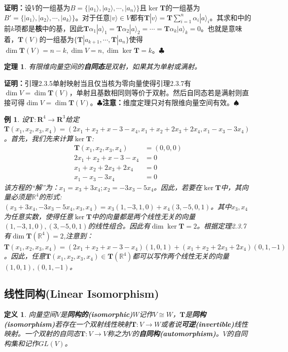 \documentclass[mathserif,hyperref,UTF8,openany,b5paper]{ctexbook}
\newtheorem{exmp}{例}[section]
\newtheorem{defn}{定义}[section]
\newtheorem{thm}{定理}[section]
\begin{document}
\textbf{证明：}设$V$的一组基为$B=\{|a_1\rangle,|a_2\rangle,\cdots,|a_n\rangle\}$且$\ker\mathbf{T}$的一组基为$B'=\{|a_1\rangle,|a_2\rangle,\cdots,|a_k\rangle\}$。对于任意$|v\rangle\in V$都有$\mathbf{T}|v\rangle=\mathbf{T}\sum^n_{i=1}\alpha_i|a\rangle_i$。其求和中的前$k$项都是\textbf{核}中的基，因此$\mathbf{T}\alpha_1|a\rangle_1=\mathbf{T}\alpha_2|a\rangle_2=\cdots=\mathbf{T}\alpha_k|a\rangle_k=0$。也就是意味着，$\mathbf{T}(V)$的一组基为$\{\mathbf{T}|a_{k+1},\cdots,\mathbf{T}|a_{n}\}$使得$\dim\mathbf{T}(V)=n-k,\dim V=n,\dim\ker\mathbf{T}=k$。$\clubsuit$
\begin{thm}
有限维向量空间的\textbf{自同态}是双射，如果其为单射或满射。
\end{thm}
\textbf{证明：}引理2.3.5单射映射当且仅当核为零向量使得引理2.3.7有$\dim V=\dim\mathbf{T}(V)$，单射且基数相同则等价于双射。然后自同态若是满射则直接可得$\dim V=\dim\mathbf{T}(V)$。$\clubsuit$\textbf{注意：}维度定理只对有限维向量空间有效。$\spadesuit$
\begin{exmp}
设$\mathbf{T}:\mathbf{R}^4\xrightarrow{}\mathbf{R}^3$给定$\mathbf{T}(x_1,x_2,x_3,x_4)=(2x_1 + x_2 + x-3−x_4,x_1 + x_2 + 2x_3 + 2x_4,x_1−x_3−3x_4)$。首先，我们先来计算$\ker\mathbf{T}$:
\begin{align}
    \mathbf{T}(x_1,x_2,x_3,x_4)&=(0,0,0)\\
    2x_1 + x_2 + x-3−x_4&=0\\
    x_1 + x_2 + 2x_3 + 2x_4&=0\\
    x_1−x_3−3x_4&=0
\end{align}
该方程的“解”为：$x_1=x_3 + 3x_4;x_2 = − 3x_3 − 5x_4$。因此，若要在$\ker\mathbf{T}$中，其向量必须是$\mathbb{R}^4$的形式:$(x_3 + 3x_4,−3x_3 − 5x_4,x_3,x_4) = x_3(1,−3,1,0)+ x_4(3,−5,0,1)$。其中$x_3,x_4$为任意实数，使得任意$\ker\mathbf{T}$中的向量都是两个线性无关的向量$(1,−3,1,0),(3,−5,0,1)$的线性组合。因此有$\dim\ker\mathbf{T}=2$。根据定理2.3.7有$\dim\mathbf{T}(\mathbb{R}^4)=2$,注意到：$\mathbf{T}(x_1,x_2,x_3,x_4)=(2x_1 + x_2 + x-3−x_4)(1,0,1)+(x_1 + x_2 + 2x_3 + 2x_4)(0,1,-1)$。因此，任意$\mathbf{T}(x_1,x_2,x_3,x_4)\in\mathbf{T}(\mathbb{R}^4)$都可以写作两个线性无关的向量$(1,0,1),(0,1,-1)$。
\end{exmp}
\subsection{线性同构(Linear Isomorphism)}
\begin{defn}
向量空间$V$是\textbf{同构的(isomorphic)}$W$记作$V\cong W$，$\mathbf{T}$是\textbf{同构(isomorphism)}若存在一个双射线性映射$\mathbf{T}:V\xrightarrow{}W$或者说\textbf{可逆(invertible)}线性映射。一个双射的自同态$\mathbf{T}:V\xrightarrow{}V$称之为$V$的\textbf{自同构(automorphism)}。$V$的自同构集和记作$GL(V)$。
\end{defn}
\end{document}
